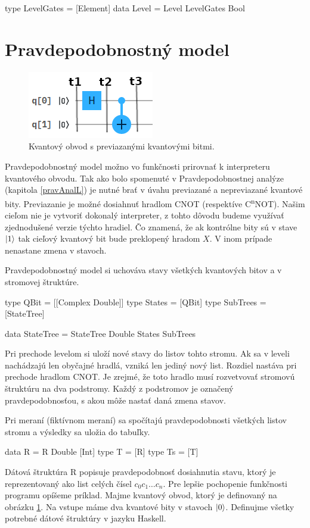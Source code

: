 \begin{code}
type LevelGates = [Element]
data Level = Level LevelGates Bool
\end{code}

\section{Pravdepodobnostný model}

\begin{figure}
	\centering 
	\includegraphics[width=.4\textwidth]{figures/circuit3.png} 
	\caption{Kvantový obvod s previazanými kvantovými bitmi.}
    \label{obvod}
\end{figure}

Pravdepodobnostný model možno vo funkčnosti prirovnať k interpreteru
kvantového obvodu. Tak ako bolo spomenuté v Pravdepodobnostnej analýze 
(kapitola \ref{pravAnalL}) je nutné brať v úvahu previazané a nepreviazané
kvantové bity. Previazanie je možné dosiahnuť hradlom CNOT (respektíve
C\textsuperscript{n}NOT). Našim cieľom nie je vytvoriť dokonalý interpreter,
z tohto dôvodu budeme využívať zjednodušené verzie týchto hradiel. Čo znamená,
že ak kontrólne bity sú v stave \(\ket{1}\) tak cieľový kvantový bit bude 
preklopený hradom \(X\). V inom prípade nenastane zmena v stavoch.


Pravdepodobnostný model si uchováva stavy všetkých kvantových bitov a 
v stromovej štruktúre. 
\begin{code}
type QBit = [[Complex Double]]
type States = [QBit]
type SubTrees = [StateTree]

data StateTree = StateTree Double States SubTrees
\end{code}

Pri prechode levelom si uloží nové stavy do listov
tohto stromu. Ak sa v leveli nachádzajú len obyčajné hradlá, vzniká len
jediný nový list. Rozdiel nastáva pri prechode hradlom CNOT. Je zrejmé, že 
toto hradlo musí rozvetvovať stromovú štruktúru na dva podstromy. Každý z 
podstromov je označený pravdepodobnosťou, s akou môže nastať daná zmena 
stavov. 

Pri meraní (fiktívnom meraní) sa spočítajú pravdepodobnosti všetkých listov
stromu a výsledky sa uložia do tabuľky. 
\begin{code}
data R = R Double [Int]
type T = [R]
type Ts = [T]
\end{code}
Dátová štruktúra R popisuje pravdepodobnosť dosiahnutia stavu, ktorý je 
reprezentovaný ako list celých čísel \(c_0c_1 \dots c_n\).
Pre lepšie pochopenie funkčnosti 
programu opíšeme príklad. Majme kvantový obvod, ktorý je definovaný na 
obrázku \ref{obvod}. Na vstupe máme dva kvantové bity v stavoch \(\ket{0}\).
Definujme všetky potrebné dátové štruktúry v jazyku Haskell. 

